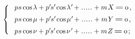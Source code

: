 \documentclass[11pt, twoside, leqno]{article}
\newcommand\equals{\scalebox{1.5}[1]{$=$}}
\newcommand\cosine{\operatorname{cos} \hspace{-0.1ex}}
\begin{document}
\begin{equation}\label{formules.9}
\left\{\;\begin{array}{l}
p \hspace{.1ex} s \cosine \lambda + p' \hspace{-0.2ex} s' \hspace{-0.2ex} \cosine \lambda\hspace{.1ex}' \hspace{-0.2ex} + \hspace{.1ex}.\kern.1ex.\kern.1ex.\kern.1ex.\kern.1ex.\hspace{.1ex} + m \hspace{.2ex} X
\hspace{.4ex} \equals \hspace{.5ex} \text{o} \hspace{.3ex} \text{,}
\\[.5em]
p \hspace{.1ex} s \cosine \mu + p' \hspace{-0.2ex} s' \hspace{-0.2ex} \cosine \mu\hspace{.1ex}' \hspace{-0.2ex} + \hspace{.1ex}.\kern.1ex.\kern.1ex.\kern.1ex.\kern.1ex.\hspace{.1ex} + m \hspace{.2ex} Y
\hspace{.4ex} \equals \hspace{.5ex} \text{o} \hspace{.3ex} \text{,}
\\[.5em]
p \hspace{.1ex} s \cosine \nu + p' \hspace{-0.2ex} s' \hspace{-0.2ex} \cosine \nu\hspace{.2ex}' \hspace{-0.2ex} + \hspace{.1ex}.\kern.1ex.\kern.1ex.\kern.1ex.\kern.1ex.\hspace{.1ex} + m \hspace{.2ex} Z
\hspace{.4ex} \equals \hspace{.5ex} \text{o} \hspace{.3ex} \text{;}
\end{array}\right.
\end{equation}
\end{document}
